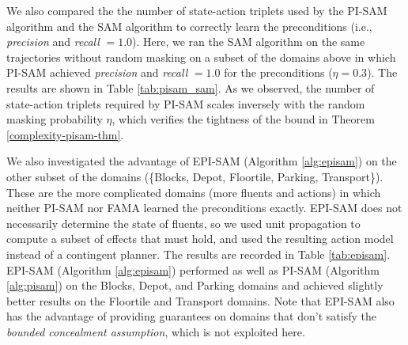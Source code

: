 \documentclass[letterpaper]{article} %
\begin{document}

We also compared the the number of state-action triplets used by the PI-SAM algorithm and the SAM algorithm \cite{juba2021safe} to correctly learn the preconditions (i.e., \textit{precision} and \textit{recall} $= 1.0$). Here, we ran the SAM algorithm \cite{juba2021safe} on the same trajectories without random masking on a subset of the domains above in which PI-SAM achieved \textit{precision} and \textit{recall} $=1.0$ for the preconditions ($\eta = 0.3$). The results are shown in Table \ref{tab:pisam_sam}. As we observed, the number of state-action triplets required by PI-SAM scales inversely with the random masking probability $\eta$, which verifies the tightness of the bound in Theorem \ref{complexity-pisam-thm}. 

    

We also investigated the advantage of EPI-SAM (Algorithm \ref{alg:episam}) on the other subset of the domains (\{Blocks, Depot, Floortile, Parking, Transport\}). These are the more complicated domains (more fluents and actions) in which neither PI-SAM nor FAMA learned the preconditions exactly. EPI-SAM does not necessarily determine the state of fluents, so we used unit propagation to compute a subset of effects that must hold, and used the resulting action model instead of a contingent planner. The results are recorded in Table \ref{tab:episam}. EPI-SAM (Algorithm \ref{alg:episam}) performed as well as PI-SAM (Algorithm \ref{alg:pisam}) on the Blocks, Depot, and Parking domains and achieved slightly better results on the Floortile and Transport domains.  Note that EPI-SAM also has the advantage of providing guarantees on domains that don't satisfy the \textit{bounded concealment assumption}, which is not exploited here.  
\end{document}
